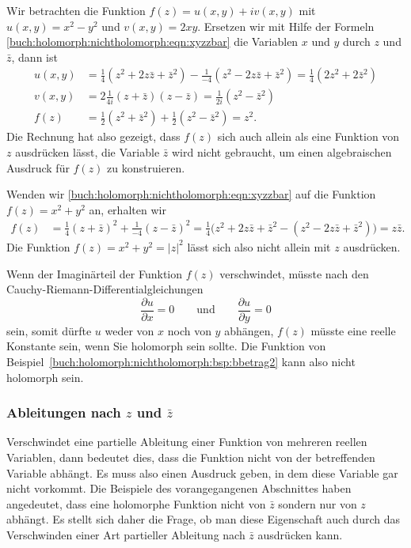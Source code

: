 \begin{beispiel}
Wir betrachten die Funktion $f(z) = u(x,y)+iv(x,y)$ mit
$u(x,y)=x^2-y^2$ und $v(x,y)=2xy$.
Ersetzen wir mit Hilfe der Formeln
\eqref{buch:holomorph:nichtholomorph:eqn:xyzzbar}
die Variablen $x$ und $y$ durch $z$ und $\bar{z}$, dann ist
\begin{align*}
u(x,y)
&=
\frac14(z^2 + 2z\bar{z} + \bar{z}^2)
-
\frac1{-4}(z^2 - 2z\bar{z} + \bar{z}^2)
=
\frac14(2z^2 + 2\bar{z}^2)
\\
v(x,y)
&=
2
\frac1{4i}(z + \bar{z})(z - \bar{z})
=
\frac{1}{2i}(z^2 - \bar{z}^2)
\\
f(z)
&=
\frac12(z^2+\bar{z}^2)
+
\frac12(z^2-\bar{z}^2)
=
z^2.
\end{align*}
Die Rechnung hat also gezeigt, dass $f(z)$ sich auch allein als eine
Funktion von $z$ ausdrücken lässt, die Variable $\bar{z}$ wird nicht
gebraucht, um einen algebraischen Ausdruck für $f(z)$ zu konstruieren.
\end{beispiel}

\begin{beispiel}
\label{buch:holomorph:nichtholomorph:bsp:bbetrag2}
Wenden wir
\eqref{buch:holomorph:nichtholomorph:eqn:xyzzbar}
auf die Funktion $f(z) = x^2 + y^2$ 
an, erhalten wir
\begin{align*}
f(z)
&=
\frac14(z+\bar{z})^2
+
\frac1{-4}(z-\bar{z})^2
=
\frac14\bigl(
z^2 + 2z\bar{z} + \bar{z}^2
-
(z^2 - 2z\bar{z} + \bar{z}^2)
\bigr)
=
z\bar{z}.
\end{align*}
Die Funktion $f(z)=x^2+y^2=|z|^2$ lässt sich also nicht allein mit
$z$ ausdrücken.
\end{beispiel}

Wenn der Imaginärteil der Funktion $f(z)$ verschwindet, müsste nach den
Cauchy-Riemann-Differentialgleichungen 
\[
\frac{\partial u}{\partial x} = 0
\qquad\text{und}\qquad
\frac{\partial u}{\partial y} = 0
\]
sein, somit dürfte $u$ weder von $x$ noch von $y$ abhängen, $f(z)$ müsste
eine reelle Konstante sein, wenn Sie holomorph sein sollte.
Die Funktion von Beispiel~\ref{buch:holomorph:nichtholomorph:bsp:bbetrag2}
kann also nicht holomorph sein.

%
%
\subsubsection{Ableitungen nach $z$ und $\bar{z}$}
Verschwindet eine partielle Ableitung einer Funktion von mehreren
reellen Variablen, dann bedeutet dies, dass die Funktion nicht
von der betreffenden Variable abhängt.
Es muss also einen Ausdruck geben, in dem diese Variable gar nicht
vorkommt.
Die Beispiele des vorangegangenen Abschnittes haben angedeutet, dass 
eine holomorphe Funktion nicht von $\bar{z}$ sondern nur von $z$ abhängt.
Es stellt sich daher die Frage, ob man diese Eigenschaft auch durch das
Verschwinden einer Art partieller Ableitung nach $\bar{z}$ ausdrücken
kann.

